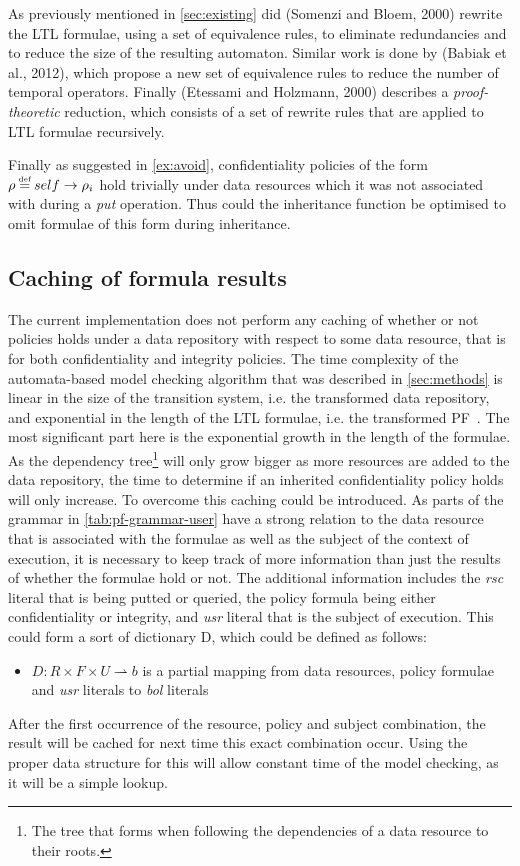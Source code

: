 As previously mentioned in \autoref{sec:existing} did (Somenzi and Bloem, 2000)\cite{somenzi2000efficient} rewrite the LTL formulae, using a set of equivalence rules, to eliminate redundancies and to reduce the size of the resulting automaton. Similar work is done by (Babiak et al., 2012)\cite{babiak2012ltl}, which propose a new set of equivalence rules to reduce the number of temporal operators. Finally (Etessami and Holzmann, 2000)\cite{etessami2000optimizing} describes a \emph{proof-theoretic} reduction, which consists of a set of rewrite rules that are applied to LTL formulae recursively.

Finally as suggested in \autoref{ex:avoid}, confidentiality policies of the form $\conf \eqdef self \imply \conf_i$ hold trivially under data resources which it was not associated with during a \emph{put} operation. Thus could the inheritance function be optimised to omit formulae of this form during inheritance.

\subsection{Caching of formula results}\label{sec:cache}
The current implementation does not perform any caching of whether or not policies holds under a data repository with respect to some data resource, that is for both confidentiality and integrity policies. The time complexity of the automata-based model checking algorithm that was described in \autoref{sec:methods} is linear in the size of the transition system, i.e. the transformed data repository, and exponential in the length of the LTL formulae, i.e. the transformed PF~\cite{baier2008principles}. The most significant part here is the exponential growth in the length of the formulae. As the dependency tree\footnote{The tree that forms when following the dependencies of a data resource to their roots.} will only grow bigger as more resources are added to the data repository, the time to determine if an inherited confidentiality policy holds will only increase. To overcome this caching could be introduced. As parts of the grammar in \autoref{tab:pf-grammar-user} have a strong relation to the data resource that is associated with the formulae as well as the subject of the context of execution, it is necessary to keep track of more information than just the results of whether the formulae hold or not. The additional information includes the \emph{rsc} literal that is being putted or queried, the policy formula being either confidentiality or integrity, and \emph{usr} literal that is the subject of execution. This could form a sort of dictionary D, which could be defined as follows:
\begin{itemize}
    \item $D : R \times F \times U \rightharpoonup b$ is a partial mapping from data resources, policy formulae and \emph{usr} literals to \emph{bol} literals
\end{itemize}
After the first occurrence of the resource, policy and subject combination, the result will be cached for next time this exact combination occur. Using the proper data structure for this will allow constant time of the model checking, as it will be a simple lookup.